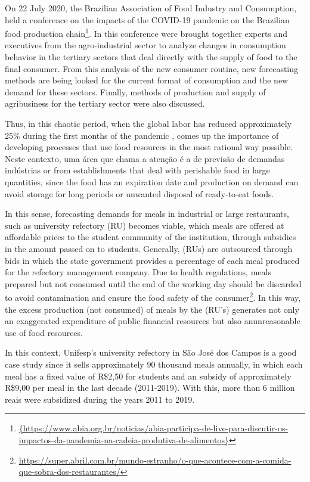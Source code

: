 On 22 July 2020, the Brazilian Association of Food Industry and Consumption, held a conference on the impacts of the COVID-19 pandemic on the Brazilian food production chain\footnote{\url{{https://www.abia.org.br/noticias/abia-participa-de-live-para-discutir-os-impactos-da-pandemia-na-cadeia-produtiva-de-alimentos}}}. In this conference were brought together experts and executives from the agro-industrial sector to analyze changes in consumption behavior in the tertiary sectors that deal directly with the supply of food to the final consumer. From this analysis of the new consumer routine, new forecasting methods are being looked for the current format of consumption and the new demand for these sectors. Finally, methods of production and supply of agribusiness for the tertiary sector were also discussed.

Thus, in this chaotic period, when the global labor has reduced approximately 25\% during the first months of the pandemic
 \cite{huff2015resilient}, comes up the importance of developing processes that use food resources in the most rational way possible. Neste contexto, uma área que chama a atenção é a de previsão de demandas indústrias or from establishments that deal with perishable food in large quantities, since the food has an expiration date and production on demand can avoid storage for long periods or unwanted disposal of ready-to-eat foods.

In this sense, forecasting demands for meals in industrial or large restaurants, such as university refectory (RU) becomes viable, which meals are offered at affordable prices to the student community of the institution, through subsidies in the amount passed on to students. Generally, (RUs) are outsourced through bids in which the state government provides a percentage of each meal produced for the refectory management company. Due to health regulations, meals prepared but not consumed until the end of the working day should be discarded to avoid contamination and ensure the food safety of the consumer\footnote{\url{https://super.abril.com.br/mundo-estranho/o-que-acontece-com-a-comida-que-sobra-dos-restaurantes/}}. In this way, the excess production (not consumed) of meals by the (RU's) generates not only an exaggerated expenditure of public financial resources but also anunreasonable use of food resources.

In this context, Unifesp's university refectory in São José dos Campos is a good case study since it sells approximately 90 thousand meals annually, in which each meal has a fixed value of R\$2,50 for students and an subsidy of approximately R\$9,00 
per meal in the last decade (2011-2019). With this, more than 6 million reais were subsidized during the years 2011 to 2019.


